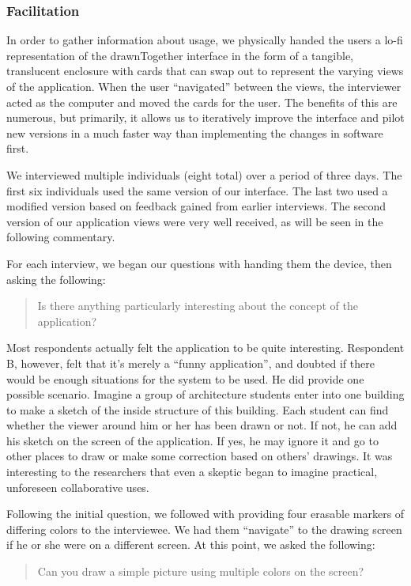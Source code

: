 \documentclass{chi2009}
\begin{document}
\subsubsection{ Facilitation }
In order to gather information about usage, we physically handed the users a
lo-fi representation of the drawnTogether interface in the form of a tangible,
translucent enclosure with cards that can swap out to represent the varying
views of the application.  When the user ``navigated'' between the views, the
interviewer acted as the computer and moved the cards for the user.  The
benefits of this are numerous, but primarily, it allows us to iteratively
improve the interface and pilot new versions in a much faster way than
implementing the changes in software first.

We interviewed multiple individuals (eight total) over a period of three days.
The first six individuals used the same version of our interface.  The last two
used a modified version based on feedback gained from earlier interviews.  The
second version of our application views were very well received, as will be
seen in the following commentary.

For each interview, we began our questions with handing them the device, then
asking the following:

\begin{quote}
Is there anything particularly interesting about the concept of the
application?
\end{quote}

Most respondents actually felt the application to be quite interesting.
Respondent B, however, felt that it's merely a ``funny application'', and
doubted if there would be enough situations for the system to be used.   He did
provide one possible  scenario. Imagine a group of architecture students enter
into one building to make a sketch of the inside structure of this building.
Each student can find whether the viewer around him or her has been drawn or
not. If not, he can add his sketch on the screen of the application.  If yes,
he may ignore it and go to other places to draw or make some correction based
on others' drawings.  It was interesting to the researchers that even a skeptic
began to imagine practical, unforeseen collaborative uses.

Following the initial question, we followed with providing four erasable
markers of differing colors to the interviewee.  We had them ``navigate'' to
the drawing screen if he or she were on a different screen.  At this point, we
asked the following:
\begin{quote}
Can you draw a simple picture using multiple colors on the screen?
\end{quote}
\end{document}

